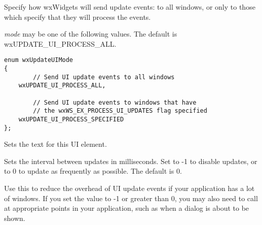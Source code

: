 
Specify how wxWidgets will send update events: to
all windows, or only to those which specify that they
will process the events.

{\it mode} may be one of the following values.
The default is wxUPDATE\_UI\_PROCESS\_ALL.

\begin{verbatim}
enum wxUpdateUIMode
{
        // Send UI update events to all windows
    wxUPDATE_UI_PROCESS_ALL,

        // Send UI update events to windows that have
        // the wxWS_EX_PROCESS_UI_UPDATES flag specified
    wxUPDATE_UI_PROCESS_SPECIFIED
};
\end{verbatim}

\label{wxupdateuieventsettext}


Sets the text for this UI element.

\label{wxupdateuieventsetupdateinterval}


Sets the interval between updates in milliseconds.
Set to -1 to disable updates, or to 0 to update as frequently as possible.
The default is 0.

Use this to reduce the overhead of UI update events if your application
has a lot of windows. If you set the value to -1 or greater than 0,
you may also need to call  
at appropriate points in your application, such as when a dialog
is about to be shown.

